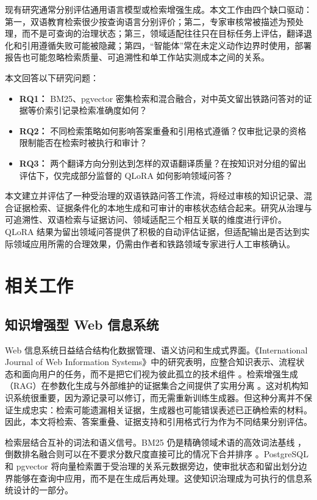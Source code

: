 现有研究通常分别评估通用语言模型或检索增强生成。本文工作由四个缺口驱动：第一，双语教育检索很少按查询语言分别评价；第二，专家审核常被描述为预处理，而不是可查询的治理状态；第三，领域适配往往只在目标任务上评估，翻译退化和引用遵循失败可能被隐藏；第四，“智能体”常在未定义动作边界时使用，部署报告也可能忽略检索质量、可追溯性和单工作站实测成本之间的关系。

本文回答以下研究问题：

\begin{itemize}
\item \textbf{RQ1：} BM25、pgvector 密集检索和混合融合，对中英文留出铁路问答对的证据等价索引记录检索准确度如何？
\item \textbf{RQ2：} 不同检索策略如何影响答案重叠和引用格式遵循？仅审批记录的资格限制能否在检索时被执行和审计？
\item \textbf{RQ3：} 两个翻译方向分别达到怎样的双语翻译质量？在按知识对分组的留出评估下，仅完成部分监督的 QLoRA 如何影响领域问答？
\end{itemize}

本文建立并评估了一种受治理的双语铁路问答工作流，将经过审核的知识记录、混合证据检索、证据条件化的本地生成和可审计的审核状态结合起来。研究从治理与可追溯性、双语检索与证据访问、领域适配三个相互关联的维度进行评价。QLoRA 结果为留出领域问答提供了积极的自动评估证据，但适配输出是否达到实际领域应用所需的合理效果，仍需由作者和铁路领域专家进行人工审核确认。

\section{相关工作}

\subsection{知识增强型 Web 信息系统}

Web 信息系统日益结合结构化数据管理、语义访问和生成式界面。《International Journal of Web Information Systems》中的研究表明，应整合知识表示、流程状态和面向用户的任务，而不是把它们视为彼此孤立的技术组件 \citep{hubscher2021knowledge}。检索增强生成（RAG）在参数化生成与外部维护的证据集合之间提供了实用分离 \citep{lewis2020rag}。这对机构知识系统很重要，因为源记录可以修订，而无需重新训练生成器。但这种分离并不保证生成忠实：检索可能遗漏相关证据，生成器也可能错误表述已正确检索的材料。因此，本文将检索、答案重叠、证据支持和引用格式行为作为不同结果分别评估。

检索层结合互补的词法和语义信号。BM25 仍是精确领域术语的高效词法基线 \citep{robertson2009bm25}，倒数排名融合则可以在不要求分数尺度直接可比的情况下合并排序 \citep{cormack2009rrf}。PostgreSQL 和 pgvector 将向量检索置于受治理的关系元数据旁边，使审批状态和留出划分边界能够在查询中应用，而不是在生成后再处理。这使知识治理成为可执行的信息系统设计的一部分。

